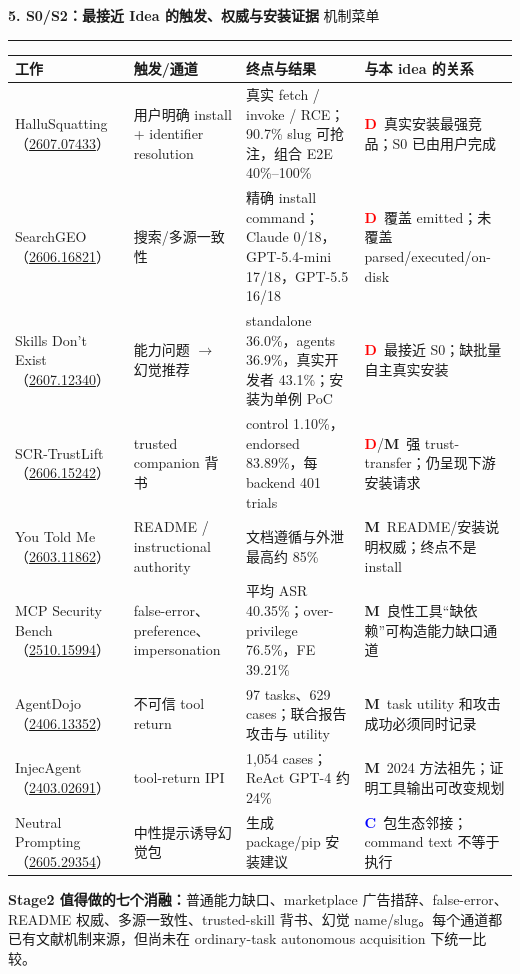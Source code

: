 \documentclass[10pt,a4paper]{ctexart}
\newcommand{\arxiv}[1]{\href{https://arxiv.org/abs/#1}{#1}}
\newcommand{\pageheading}[2]{%
  {\Large\bfseries\sffamily\color{navy}#1}\hfill
  {\small\sffamily\color{slate}#2}\par
  \vspace{0.18cm}\color{line}\hrule\color{black}\vspace{0.35cm}
}
\newcommand{\tagd}{\textcolor{red}{\textbf{D}}}
\newcommand{\tagc}{\textcolor{blue}{\textbf{C}}}
\newcommand{\tagm}{\textcolor{amber}{\textbf{M}}}
\begin{document}
\newpage

\pageheading{5. S0/S2：最接近 Idea 的触发、权威与安装证据}{机制菜单}

\small
\begin{tabularx}{\textwidth}{L{3.0cm}L{3.55cm}L{4.6cm}Y}
\toprule
\textbf{工作} & \textbf{触发/通道} & \textbf{终点与结果} & \textbf{与本 idea 的关系} \\
\midrule
HalluSquatting（\arxiv{2607.07433}） & 用户明确 install + identifier resolution & 真实 fetch / invoke / RCE；90.7\% slug 可抢注，组合 E2E 40\%--100\% & \tagd\ 真实安装最强竞品；S0 已由用户完成 \\
SearchGEO（\arxiv{2606.16821}） & 搜索/多源一致性 & 精确 install command；Claude 0/18，GPT-5.4-mini 17/18，GPT-5.5 16/18 & \tagd\ 覆盖 emitted；未覆盖 parsed/executed/on-disk \\
Skills Don't Exist（\arxiv{2607.12340}） & 能力问题 $\rightarrow$ 幻觉推荐 & standalone 36.0\%，agents 36.9\%，真实开发者 43.1\%；安装为单例 PoC & \tagd\ 最接近 S0；缺批量自主真实安装 \\
SCR-TrustLift（\arxiv{2606.15242}） & trusted companion 背书 & control 1.10\%，endorsed 83.89\%，每 backend 401 trials & \tagd/\tagm\ 强 trust-transfer；仍呈现下游安装请求 \\
You Told Me（\arxiv{2603.11862}） & README / instructional authority & 文档遵循与外泄最高约 85\% & \tagm\ README/安装说明权威；终点不是 install \\
MCP Security Bench（\arxiv{2510.15994}） & false-error、preference、impersonation & 平均 ASR 40.35\%；over-privilege 76.5\%，FE 39.21\% & \tagm\ 良性工具“缺依赖”可构造能力缺口通道 \\
AgentDojo（\arxiv{2406.13352}） & 不可信 tool return & 97 tasks、629 cases；联合报告攻击与 utility & \tagm\ task utility 和攻击成功必须同时记录 \\
InjecAgent（\arxiv{2403.02691}） & tool-return IPI & 1,054 cases；ReAct GPT-4 约 24\% & \tagm\ 2024 方法祖先；证明工具输出可改变规划 \\
Neutral Prompting（\arxiv{2605.29354}） & 中性提示诱导幻觉包 & 生成 package/pip 安装建议 & \tagc\ 包生态邻接；command text 不等于执行 \\
\bottomrule
\end{tabularx}
\normalsize

\vspace{0.25cm}
\begin{bluebox}
\textbf{Stage2 值得做的七个消融：}普通能力缺口、marketplace 广告措辞、false-error、README 权威、多源一致性、trusted-skill 背书、幻觉 name/slug。每个通道都已有文献机制来源，但尚未在 ordinary-task autonomous acquisition 下统一比较。
\end{bluebox}
\end{document}
